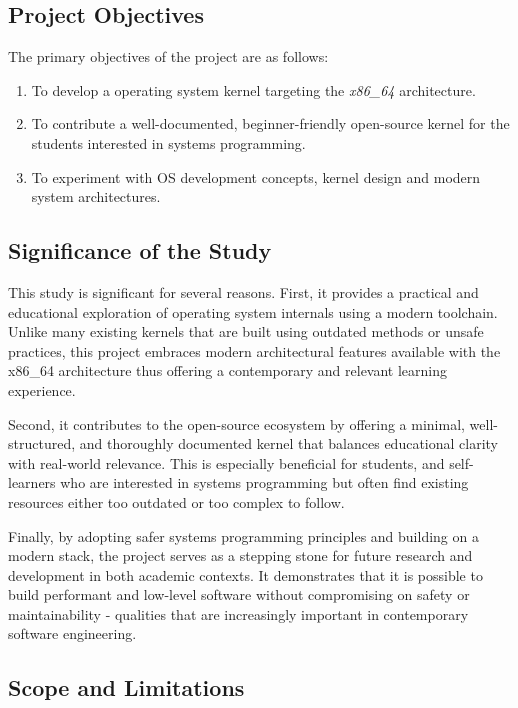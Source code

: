 \documentclass[12pt]{extarticle}
\begin{document}
\subsection{Project Objectives}
    The primary objectives of the project are as follows:
    \begin{enumerate}
    \item To develop a operating system kernel targeting the \textit{x86\_64} architecture.
    \item To contribute a well-documented, beginner-friendly open-source kernel
    for the students interested in systems programming.
    \item To experiment with OS development concepts, kernel design and modern system architectures.
    \end{enumerate}

\pagebreak

\subsection{Significance of the Study}

This study is significant for several reasons. First, it provides a practical
and educational exploration of operating system internals using a modern
toolchain. Unlike many existing kernels that are built using outdated methods or
unsafe practices, this project embraces modern architectural features available
with the x86\_64 architecture thus offering a contemporary and relevant learning
experience.

Second, it contributes to the open-source ecosystem by offering a minimal,
well-structured, and thoroughly documented kernel that balances educational
clarity with real-world relevance. This is especially beneficial for students,
and self-learners who are interested in systems programming but often find
existing resources either too outdated or too complex to follow.

Finally, by adopting safer systems programming principles and building on a
modern stack, the project serves as a stepping stone for future research and
development in both academic contexts. It demonstrates that it is possible to
build performant and low-level software without compromising on safety or
maintainability - qualities that are increasingly important in contemporary
software engineering.

\pagebreak

\subsection{Scope and Limitations}
\end{document}
